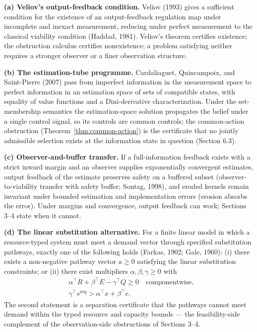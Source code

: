 \documentclass[10pt,twocolumn]{article}
\theoremstyle{definition}
\begin{document}
\textbf{(a) Veliov's output-feedback condition.} Veliov (1993) gives a sufficient condition for the existence of an output-feedback regulation map under incomplete and inexact measurement, reducing under perfect measurement to the classical viability condition (Haddad, 1981). Veliov's theorem certifies existence; the obstruction calculus certifies nonexistence; a problem satisfying neither requires a stronger observer or a finer observation structure.

\textbf{(b) The estimation-tube programme.} Cardaliaguet, Quincampoix, and Saint-Pierre (2007) pass from imperfect information in the measurement space to perfect information in an estimation space of sets of compatible states, with equality of value functions and a Dini-derivative characterization. Under the set-membership semantics the estimation-space solution propagates the belief under a single control signal, so its controls are common controls; the common-action obstruction (Theorem~\ref{thm:common-action}) is the certificate that no jointly admissible selection exists at the information state in question (Section 6.3).

\textbf{(c) Observer-and-buffer transfer.} If a full-information feedback exists with a strict inward margin and an observer supplies exponentially convergent estimates, output feedback of the estimate preserves safety on a buffered subset (observer-to-viability transfer with safety buffer; Sontag, 1998), and eroded kernels remain invariant under bounded estimation and implementation errors (erosion absorbs the error). Under margins and convergence, output feedback can work; Sections 3--4 state when it cannot.

\textbf{(d) The linear substitution alternative.} For a finite linear model in which a resource-typed system must meet a demand vector through specified substitution pathways, exactly one of the following holds (Farkas, 1902; Gale, 1960): (i) there exists a non-negative pathway vector \(a \ge 0\) satisfying the linear substitution constraints; or (ii) there exist multipliers \(\alpha, \beta, \gamma \ge 0\) with
\[
\begin{aligned}
&\alpha^\top R + \beta^\top E - \gamma^\top Q \ge 0 \quad\text{componentwise},\\
&\gamma^\top s^{\mathrm{req}} > \alpha^\top x + \beta^\top e.
\end{aligned}
\]
The second statement is a separation certificate that the pathways cannot meet demand within the typed resource and capacity bounds --- the feasibility-side complement of the observation-side obstructions of Sections 3--4.
\end{document}
